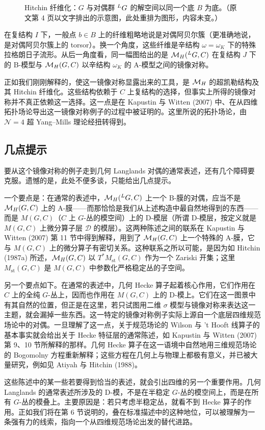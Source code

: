 \begin{figure}[htbp]
\centering
{}
\caption{Hitchin 纤维化：$G$ 与对偶群 ${}^{L}G$ 的解空间以同一个底 $B$ 为底。（原文第 4 页以文字排出的示意图，此处重排为图形，内容未变。）}
\label{fig:hitchin}
\end{figure}

在复结构 $I$ 下，一般点 $b\in B$ 上的纤维粗略地说是对偶阿贝尔簇（更准确地说，是对偶阿贝尔簇上的 torsor）。换一个角度，这些纤维是辛结构 $\omega=\omega_{K}$ 下的特殊拉格朗日子流形。从后一角度看，同一幅图给出的是 $\mathcal{M}_{H}({}^{L}G,C)$ 在复结构 $J$ 下的 B-模型与 $\mathcal{M}_{H}(G,C)$ 以辛结构 $\omega_{K}$ 的 A-模型之间的镜像对称。

正如我们刚刚解释的，使这一镜像对称显露出来的工具，是 $\mathcal{M}_{H}$ 的超凯勒结构及其 Hitchin 纤维化。这些结构依赖于 $C$ 上复结构的选择，但事实上所得的镜像对称并不真正依赖这一选择。这一点是在 Kapustin 与 Witten (2007) 中、在从四维拓扑场论导出这一镜像对称例子的过程中被证明的。这里所说的拓扑场论，由 $\mathcal{N}=4$ 超 Yang–Mills 理论经扭转得到。

\subsection{几点提示}

要从这个镜像对称的例子走到几何 Langlands 对偶的通常表述，还有几个障碍要克服。遗憾的是，此处不便多谈，只能给出几点提示。

一个要点是：在通常的表述中，$\mathcal{M}_{H}({}^{L}G,C)$ 上一个 B-膜的对偶，应当不是 $\mathcal{M}_{H}(G,C)$ 上的 A-膜——而那恰恰是我们从上述构造中最自然地得到的东西——而是 $M(G,C)$（$C$ 上 $G$-丛的模空间）上的 D-模层（所谓 D-模层，按定义就是 $M(G,C)$ 上微分算子层 $\mathcal{D}$ 的模层）。这两种陈述之间的联系在 Kapustin 与 Witten (2007) 第 11 节中得到解释，用到了 $\mathcal{M}_{H}(G,C)$ 上一个特殊的 A-膜，它与 $M(G,C)$ 上的微分算子有密切关系。这种联系之所以可能，是因为如 Hitchin (1987a) 所述，$\mathcal{M}_{H}(G,C)$ 以 $T^{*}M_{\mathrm{st}}(G,C)$ 作为一个 Zariski 开集；这里 $M_{\mathrm{st}}(G,C)$ 是 $M(G,C)$ 中参数化严格稳定丛的子空间。

另一个要点如下。在通常的表述中，几何 Hecke 算子起着核心作用，它们作用在 $C$ 上的全纯 $G$-丛上，因而也作用在 $M(G,C)$ 上的 D-模上。它们在这一图景中有其自然的位置，但正是在这里，若只试图用二维 $\sigma$ 模型与镜像对称来表达这一主题，就会漏掉一些东西。这一特定的镜像对称例子实际上源自一个底层四维规范场论中的对偶。一旦理解了这一点，关于规范场论的 Wilson 与 't Hooft 线算子的基本事实就会给出关于 Hecke 特征层的通常陈述，如 Kapustin 与 Witten (2007) 第 9、10 节所解释的那样。几何 Hecke 算子在这一语境中自然地用三维规范场论的 Bogomolny 方程重新解释；这些方程在几何上与物理上都极有意义，并已被大量研究，例如见 Atiyah 与 Hitchin (1988)。

这些陈述中的某一些若要得到恰当的表述，就会引出四维的另一个重要作用。几何 Langlands 的通常表述所涉及的 D-模，不是在半稳定 $G$-丛的模空间上，而是在所有 $G$-丛的模叠上。主要原因是：若只考虑半稳定丛，就看不到 Hecke 算子的作用。正如我们将在第 6 节说明的，叠在标准描述中的这种地位，可以被理解为一条强有力的线索，指向一个从四维规范场论出发的替代进路。
